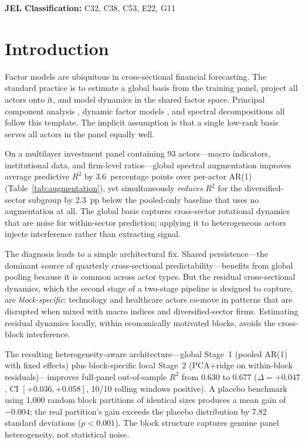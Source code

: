 \documentclass[11pt,a4paper]{article}
\begin{document}
\noindent\textbf{JEL Classification:} C32, C38, C53, E22, G11

\newpage

\section{Introduction}
\label{sec:intro}

Factor models are ubiquitous in cross-sectional financial forecasting. The standard practice is to estimate a global basis from the training panel, project all actors onto it, and model dynamics in the shared factor space. Principal component analysis \citep{stock2002forecasting,bai2002determining}, dynamic factor models \citep{doz2012quasi}, and spectral decompositions \citep{schmid2010dynamic} all follow this template. The implicit assumption is that a single low-rank basis serves all actors in the panel equally well.

On a multilayer investment panel containing 93 actors---macro indicators, institutional data, and firm-level ratios---global spectral augmentation improves average predictive $R^2$ by 3.6~percentage points over per-actor AR(1) (Table~\ref{tab:augmentation}), yet simultaneously \emph{reduces} $R^2$ for the diversified-sector subgroup by 2.3~pp below the pooled-only baseline that uses no augmentation at all. The global basis captures cross-sector rotational dynamics that are noise for within-sector prediction; applying it to heterogeneous actors injects interference rather than extracting signal.

The diagnosis leads to a simple architectural fix. Shared persistence---the dominant source of quarterly cross-sectional predictability---benefits from global pooling because it is common across actor types. But the residual cross-sectional dynamics, which the second stage of a two-stage pipeline is designed to capture, are \emph{block-specific}: technology and healthcare actors co-move in patterns that are disrupted when mixed with macro indices and diversified-sector firms. Estimating residual dynamics locally, within economically motivated blocks, avoids the cross-block interference.

The resulting heterogeneity-aware architecture---global Stage~1 (pooled AR(1) with fixed effects) plus block-specific local Stage~2 (PCA+ridge on within-block residuals)---improves full-panel out-of-sample $R^2$ from 0.630 to 0.677 ($\Delta = +0.047$, CI $[+0.036, +0.058]$, 10/10 rolling windows positive). A placebo benchmark using 1{,}000 random block partitions of identical sizes produces a mean gain of $-0.004$; the real partition's gain exceeds the placebo distribution by 7.82 standard deviations ($p < 0.001$). The block structure captures genuine panel heterogeneity, not statistical noise.
\end{document}
